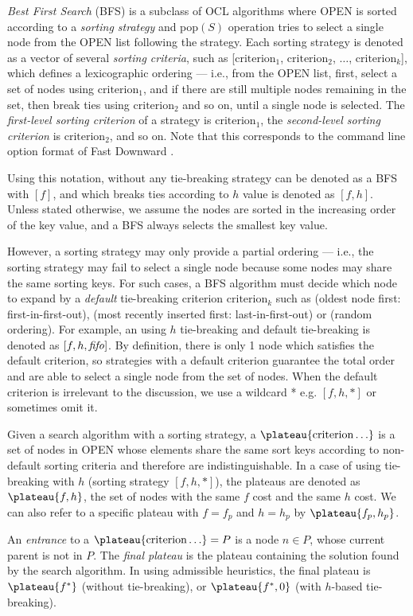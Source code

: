\emph{Best First Search} (BFS) is a subclass of OCL algorithms where OPEN is sorted according to a \emph{sorting strategy} and pop$(S)$ operation tries to select a single node from the OPEN list following the strategy.
Each sorting strategy is denoted as a vector of several \emph{sorting criteria}, such as
[$\text{criterion}_1$, $\text{criterion}_2$, $\ldots$,
$\text{criterion}_k$], which defines a lexicographic ordering ---
i.e., from the OPEN list, first, select a
set of nodes using $\text{criterion}_1$, and if there are still multiple
nodes remaining in the set, then break ties using $\text{criterion}_2$
and so on, until a single node is selected.  The \emph{first-level
sorting criterion} of a strategy is $\text{criterion}_1$, the
\emph{second-level sorting criterion} is $\text{criterion}_2$, and so on.
Note that this corresponds to the command line option format of Fast
Downward \cite{Helmert2006}.

Using this notation, \astar without any tie-breaking strategy can be
denoted as a BFS with $[f]$, and \astar which breaks ties according to $h$
value is denoted as $[f,h]$.
Unless stated otherwise, we assume the nodes are sorted in the
increasing order of the key value, and a BFS always selects the smallest
key value.

However, a sorting strategy may only provide a partial ordering ---
i.e., the sorting strategy may fail to select a single node because some nodes
may share the same sorting keys.
For such cases, a BFS algorithm must
decide which node to expand by a \emph{default} tie-breaking
criterion $\text{criterion}_k$ such as  \fifo (oldest node first: first-in-first-out), \lifo
(most recently inserted first: last-in-first-out) or \ro (random ordering).
For example, an \astar using $h$ tie-breaking and \fifo default tie-breaking
 is denoted as $[f,h,{\text{\textit{fifo}}}]$.
By definition, there is only 1 node which satisfies the default criterion, so
strategies with a default criterion guarantee the total order and
are able to select a single node from the set of nodes.
When the default criterion is irrelevant to the discussion,
we use a wildcard * e.g. $[f,h,*]$ or sometimes omit it.

Given a search algorithm with a sorting strategy, 
a $\plateau{\text{criterion}\ldots}$ is a set of nodes in OPEN whose elements share
the same sort keys according to non-default sorting criteria and therefore
are indistinguishable. In a case of \astar
using tie-breaking with $h$ (sorting strategy $[f,h,*]$), the plateaus are denoted as
$\plateau{f,h}$, the set of nodes with the same $f$ cost and the same $h$ cost.
We can also refer to a specific plateau with $f=f_p$ and $h=h_p$ by $\plateau{f_p,h_p}$.

An \emph{entrance} to a $\plateau{\text{criterion}\ldots}=P$ is
a node $n \in P$, whose current parent is not in
$P$. The \emph{final plateau} is the plateau
containing the solution found by the search algorithm.  In \astar using
admissible heuristics, the final plateau is $\plateau{f^*}$ (without
tie-breaking), or $\plateau{f^*,0}$ (with $h$-based tie-breaking).
